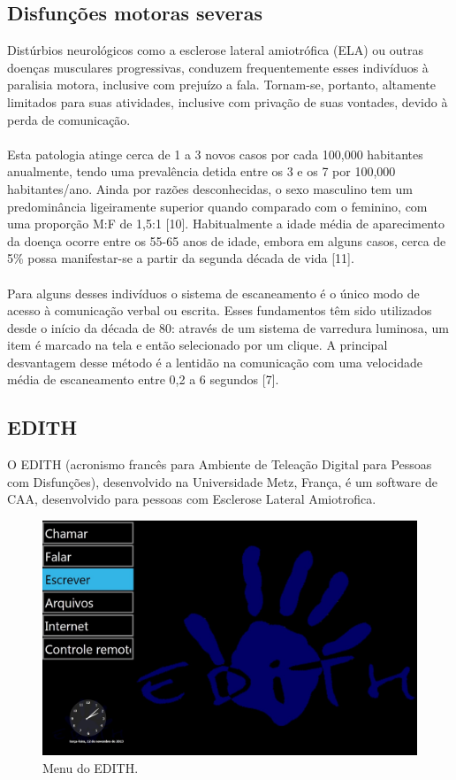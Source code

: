 \documentclass[twoside]{article}
\begin{document}
\begin{multicols}{2}
\subsection{Disfunções motoras severas}
Distúrbios neurológicos como a esclerose lateral amiotrófica (ELA) ou outras doenças musculares progressivas, conduzem frequentemente esses indivíduos à paralisia motora, inclusive com prejuízo a fala. Tornam-se, portanto, altamente limitados para suas atividades, inclusive com privação de suas vontades, devido à perda de comunicação.
\\\\
Esta patologia atinge cerca de 1 a 3 novos casos por cada 100,000 habitantes anualmente, tendo uma prevalência detida entre os 3 e os 7 por 100,000 habitantes/ano. Ainda por razões desconhecidas, o sexo masculino tem um predominância ligeiramente superior quando comparado com o feminino, com uma proporção M:F de 1,5:1 [10]. Habitualmente a idade média de aparecimento da doença ocorre entre os 55-65 anos de idade, embora em  alguns casos, cerca de 5\% possa manifestar-se a partir da segunda década de vida [11].
\\\\
Para alguns desses indivíduos o sistema de escaneamento é o único modo de acesso à comunicação verbal ou escrita. Esses fundamentos têm sido utilizados desde o início da década de 80: através de um sistema de varredura luminosa, um item é marcado na tela e então selecionado por um clique. A principal desvantagem desse método é a lentidão na comunicação com uma velocidade média de escaneamento entre 0,2 a 6 segundos [7].

\subsection{EDITH}
O EDITH (acronismo francês para Ambiente de Teleação Digital para Pessoas com Disfunções), desenvolvido na Universidade Metz, França, é um software de CAA, desenvolvido para pessoas com Esclerose Lateral Amiotrofica.

\begin{figure}[H]
\label{fig:edith_menu}
  \caption{Menu do EDITH.}
  \centering
    \includegraphics[scale = 0.18]{edith_menu.png}
\end{figure}


\end{multicols}
\end{document}
